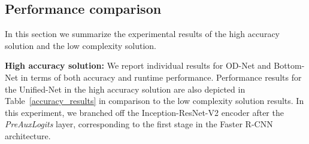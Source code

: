 \documentclass[10pt,twocolumn,letterpaper]{article}
\begin{document}
\subsection{Performance comparison}

In this section we summarize the experimental results of the high accuracy solution and the low complexity solution.

\begin{table*}
\begin{center}
\end{center}
\caption{Performance comparison of Unified-Net LC, Unified-Net HC, OD-Net and Bottom-Net}
\label{accuracy_results}
\end{table*}

\textbf{High accuracy solution: } We report individual results for OD-Net and Bottom-Net in terms of both accuracy and runtime performance. Performance results for the Unified-Net in the high accuracy solution are also depicted in Table~\ref{accuracy_results} in comparison to the low complexity solution results. In this experiment, we branched off the Inception-ResNet-V2 encoder after the \textit{PreAuxLogits} layer, corresponding to the first stage in the Faster R-CNN architecture.
\end{document}
